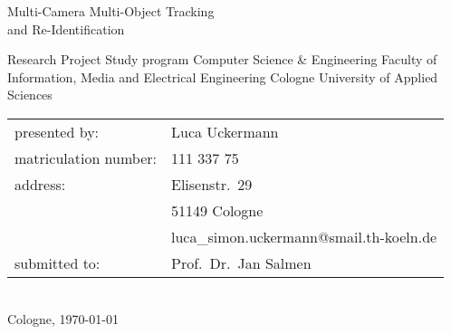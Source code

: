 \begin{titlepage}

    \begin{center}
    \end{center}

    \vspace*{10mm}

    \begin{huge}
        \noindent
        Multi-Camera Multi-Object Tracking\\and Re-Identification\\[10mm]
    \end{huge}

    Research Project\newline
    Study program Computer Science \& Engineering\newline
    Faculty of Information, Media and Electrical Engineering\newline
    Cologne University of Applied Sciences\\[30mm]

    \begin{tabular}{@{}ll}
        presented by:         & Luca Uckermann                          \\
        matriculation number: & 111 337 75                              \\
        address:              & Elisenstr.~29                           \\
                              & 51149 Cologne                           \\
                              & luca\_simon.uckermann@smail.th-koeln.de \\[5mm]
        submitted to:         & Prof.~Dr.~Jan Salmen                    \\
    \end{tabular}
    \\[10mm]

    Cologne, \today

\end{titlepage}